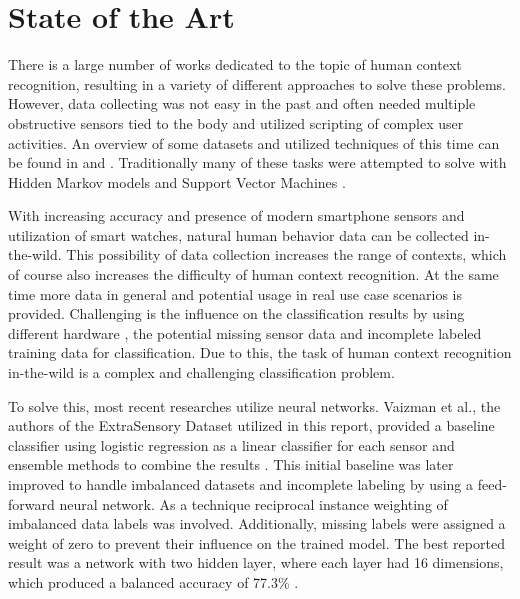 \section{State of the Art}
There is a large number of works dedicated to the topic of human context recognition, resulting in a variety of different approaches to solve these problems. However, data collecting was not easy in the past and often needed multiple obstructive sensors tied to the body and utilized scripting of complex user activities. An overview of some datasets and utilized techniques of this time can be found in \cite{Ramasamy18} and \cite{Lara13}. Traditionally many of these tasks were attempted to solve with Hidden Markov models \cite{Lee11} and Support Vector Machines \cite{Anguita12}. 

With increasing accuracy and presence of modern smartphone sensors and utilization of smart watches, natural human behavior data can be collected in-the-wild. This possibility of data collection increases the range of contexts, which of course also increases the difficulty of human context recognition. At the same time more data in general and potential usage in real use case scenarios is provided.  Challenging is the influence on the classification results by using different hardware \cite{Stisen15}, the potential missing sensor data and incomplete labeled training data for classification. Due to this, the task of human context recognition in-the-wild is a complex and challenging classification problem. 

To solve this, most recent researches utilize neural networks. Vaizman et al., the authors of the \gl ExtraSensory Dataset\gr{} utilized in this report, provided a baseline classifier using logistic regression as a linear classifier for each sensor and ensemble methods to combine the results \cite{Vaizman17}. This initial baseline was later improved to handle imbalanced datasets and incomplete labeling by using a feed-forward neural network. As a technique reciprocal instance weighting of imbalanced data labels was involved. Additionally, missing labels were assigned a weight of zero to prevent their influence on the trained model. The best reported result was a network with two hidden layer, where each layer had 16 dimensions, which produced a balanced accuracy of 77.3\% \cite{Vaizman18}. 

